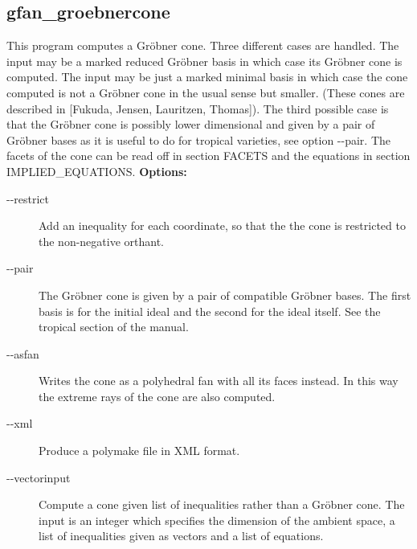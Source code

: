 {{{{{{{{{{{{{{{\subsection{gfan\_groebnercone}\label{applist:_groebnercone}
This program computes a Gr\"obner cone. Three different cases are handled. The input may be a marked reduced Gr\"obner basis in which case its Gr\"obner cone is computed. The input may be just a marked minimal basis in which case the cone computed is not a Gr\"obner cone in the usual sense but smaller. (These cones are described in [Fukuda, Jensen, Lauritzen, Thomas]). The third possible case is that the Gr\"obner cone is possibly lower dimensional and given by a pair of Gr\"obner bases as it is useful to do for tropical varieties, see option -\hspace{0.013cm}-pair. The facets of the cone can be read off in section FACETS and the equations in section IMPLIED\_EQUATIONS.
\newline
{\bf Options:}
\begin{description}
\item[-\hspace{0.013cm}-restrict]Add an inequality for each coordinate, so that the the cone is restricted to the non-negative orthant.\item[-\hspace{0.013cm}-pair]The Gr\"obner cone is given by a pair of compatible Gr\"obner bases. The first basis is for the initial ideal and the second for the ideal itself. See the tropical section of the manual.\item[-\hspace{0.013cm}-asfan]Writes the cone as a polyhedral fan with all its faces instead. In this way the extreme rays of the cone are also computed.\item[-\hspace{0.013cm}-xml]Produce a polymake file in XML format.
\item[-\hspace{0.013cm}-vectorinput]Compute a cone given list of inequalities rather than a Gr\"obner cone. The input is an integer which specifies the dimension of the ambient space, a list of inequalities given as vectors and a list of equations.\end{description}


}}}}}}}}}}}}}}}
